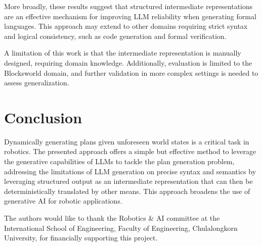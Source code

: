 \documentclass[acmlarge]{acmart}
\begin{document}
More broadly, these results suggest that structured intermediate representations are an effective mechanism for improving LLM reliability when generating formal languages. This approach may extend to other domains requiring strict syntax and logical consistency, such as code generation and formal verification.

A limitation of this work is that the intermediate representation is manually designed, requiring domain knowledge. Additionally, evaluation is limited to the Blocksworld domain, and further validation in more complex settings is needed to assess generalization.

\section{Conclusion}
\label{sec:conclusion}

Dynamically generating plans given unforeseen world states is a critical task in robotics. 
The presented approach offers a simple but effective method to leverage the generative capabilities of LLMs to tackle the plan generation problem, addressing the limitations of LLM generation on precise syntax and semantics by leveraging structured output as an intermediate representation that can then be deterministically translated by other means. This approach broadens the use of generative AI for robotic applications. 


\begin{acks}
The authors would like to thank the Robotics \& AI committee at the International School of Engineering, Faculty of Engineering, Chulalongkorn University, for financially supporting this project.
\end{acks}





\end{document}
